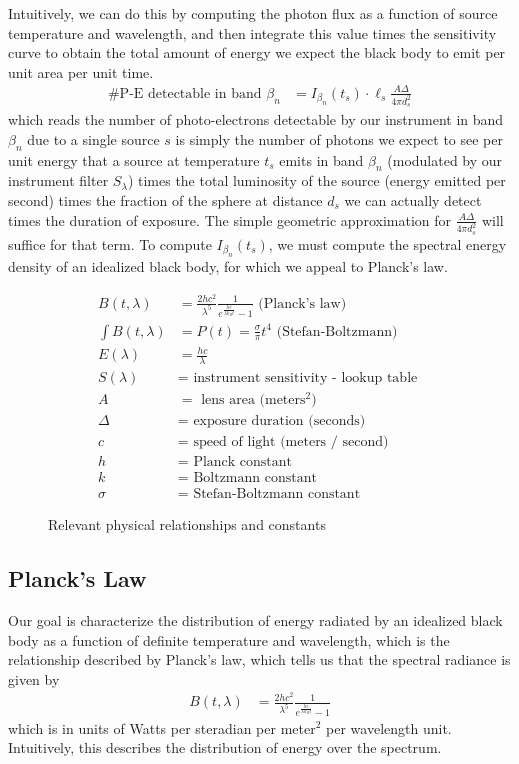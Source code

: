 \documentclass[11pt]{article}
\begin{document}
Intuitively, we can do this by computing the photon flux as a function of source temperature and wavelength, and then integrate this value times the sensitivity curve to obtain the total amount of energy we expect the black body to emit per unit area per unit time.  
\begin{align}
  \text{\# P-E detectable in band $\beta_n$} &= I_{\beta_n}(t_s) \cdot \ell_s \frac{A \Delta}{4\pi d_s^2}  
  \label{eq:brightness}
\end{align}
which reads the number of photo-electrons detectable by our instrument in band $\beta_n$ due to a single source $s$ is simply the number of photons we expect to see per unit energy that a source at temperature $t_s$ emits in band $\beta_n$ (modulated by our instrument filter $S_\lambda$) times the total luminosity of the source (energy emitted per second) times the fraction of the sphere at distance $d_s$ we can actually detect times the duration of exposure.  The simple geometric approximation for $\frac{ A \Delta }{ 4 \pi d_s^2 }$ will suffice for that term.  To compute $I_{\beta_n}(t_s)$, we must compute the spectral energy density of an idealized black body, for which we appeal to Planck's law. 

\begin{figure}[t!]
\begin{align*}
  B(t, \lambda) &= \frac{2 h c^2}{\lambda^5} \frac{1}{ e^{\frac{hc}{\lambda k_B t}} - 1} \text{ (Planck's law) } \\
  \int B(t, \lambda) &= P(t) = \frac{\sigma}{\pi} t^4  \text{ (Stefan-Boltzmann) }\\
  E(\lambda) &= \frac{hc}{\lambda} \\
  S(\lambda) &= \text{ instrument sensitivity - lookup table } \\
  A &= \text{ lens area (meters$^2$) } \\
  \Delta  &= \text{ exposure duration (seconds) } \\
  c &= \text{ speed of light (meters / second) } \\
  h &= \text{ Planck constant } \\
  k &= \text{ Boltzmann constant } \\
  \sigma &= \text{ Stefan-Boltzmann constant } 
\end{align*}
\caption{Relevant physical relationships and constants}
\end{figure}

\subsection{Planck's Law}
Our goal is characterize the distribution of energy radiated by an idealized black body as a function of definite temperature and wavelength, which is the relationship described by Planck's law, which tells us that the spectral radiance is given by
\begin{align}
  B(t, \lambda) &= \frac{2 h c^2}{\lambda^5} \frac{1}{ e^{\frac{hc}{\lambda k_B t}} - 1}
\end{align}
which is in units of Watts per steradian per meter$^2$ per wavelength unit.  Intuitively, this describes the distribution of energy over the spectrum.  
\end{document}
